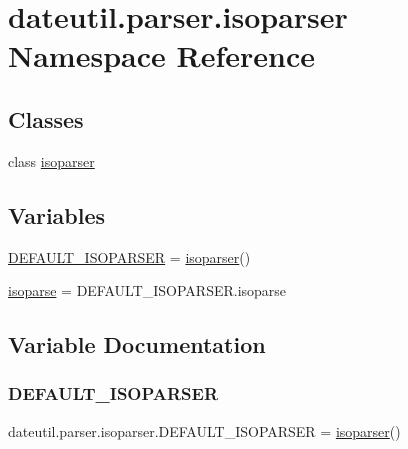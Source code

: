 \hypertarget{namespacedateutil_1_1parser_1_1isoparser}{}\section{dateutil.\+parser.\+isoparser Namespace Reference}
\label{namespacedateutil_1_1parser_1_1isoparser}
\subsection*{Classes}
\begin{DoxyCompactItemize}
\item 
class \hyperlink{classdateutil_1_1parser_1_1isoparser_1_1isoparser}{isoparser}
\end{DoxyCompactItemize}
\subsection*{Variables}
\begin{DoxyCompactItemize}
\item 
\hyperlink{namespacedateutil_1_1parser_1_1isoparser_aba9a7f0ed9b077b82f2275576bb72f2c}{D\+E\+F\+A\+U\+L\+T\+\_\+\+I\+S\+O\+P\+A\+R\+S\+ER} = \hyperlink{classdateutil_1_1parser_1_1isoparser_1_1isoparser}{isoparser}()
\item 
\hyperlink{namespacedateutil_1_1parser_1_1isoparser_a017b99f58c4680ce93017afeecdc838d}{isoparse} = D\+E\+F\+A\+U\+L\+T\+\_\+\+I\+S\+O\+P\+A\+R\+S\+E\+R.\+isoparse
\end{DoxyCompactItemize}


\subsection{Variable Documentation}
\mbox{\label{namespacedateutil_1_1parser_1_1isoparser_aba9a7f0ed9b077b82f2275576bb72f2c}} 
\subsubsection{\texorpdfstring{D\+E\+F\+A\+U\+L\+T\+\_\+\+I\+S\+O\+P\+A\+R\+S\+ER}{DEFAULT\_ISOPARSER}}
{\footnotesize\ttfamily dateutil.\+parser.\+isoparser.\+D\+E\+F\+A\+U\+L\+T\+\_\+\+I\+S\+O\+P\+A\+R\+S\+ER = \hyperlink{classdateutil_1_1parser_1_1isoparser_1_1isoparser}{isoparser}()}

